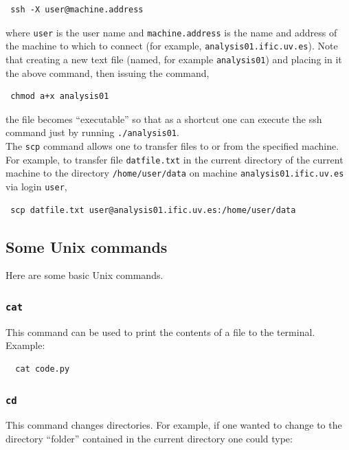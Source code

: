 \documentclass[10pt]{article}
\begin{document}
\begin{verbatim}
 ssh -X user@machine.address
\end{verbatim}

\noindent where \verb|user| is the user name and \verb|machine.address| is the name and address of the machine to which to connect (for example, \verb|analysis01.ific.uv.es|).  Note that creating a new text
file (named, for example \verb|analysis01|) and placing in it the above command, then issuing the command,

\begin{verbatim}
 chmod a+x analysis01
\end{verbatim}

\noindent the file becomes ``executable'' so that as a shortcut one can execute the ssh command just by running \verb|./analysis01|.\\

\noindent The \verb|scp| command allows one to transfer files to or from the specified machine.  For example, to transfer file \verb|datfile.txt| in the current directory of the current machine to the directory 
\verb|/home/user/data| on machine \verb|analysis01.ific.uv.es| via login \verb|user|,

\begin{verbatim}
 scp datfile.txt user@analysis01.ific.uv.es:/home/user/data
\end{verbatim}

\subsection{Some Unix commands}\label{ss_app_commands}
\noindent Here are some basic Unix commands.

\subsubsection{\texttt{cat}}
\noindent This command can be used to print the contents of a file to the terminal.  Example: 

\begin{verbatim}
  cat code.py
\end{verbatim}

\subsubsection{\texttt{cd}}
\noindent This command changes directories.  For example, if one wanted to change to the directory ``folder'' contained in the current directory one could type:
\end{document}
